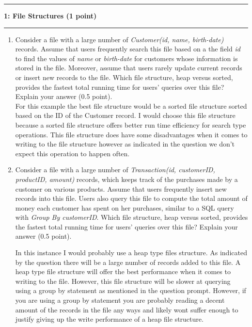 \documentclass[11pt]{article}
\newcommand\question[2]{\vspace{.25in}\hrule\textbf{#1: #2}\vspace{.5em}\hrule\vspace{.10in}}
\begin{document}
\question{1}{File Structures (1 point)}
\begin{enumerate}
\item Consider a file with a large number of \textit{Customer(id, name, birth-date)} records. Assume that users frequently search this file based on a the field \textit{id} to find the values of \textit{name} or \textit{birth-date} for customers whose information is stored in the file. Moreover, assume that users rarely update current records or insert new records to the file. Which file structure, heap versus sorted, provides the fastest total running time for users' queries over this file? Explain your answer (0.5 point).\\

For this example the best file structure would be a sorted file structure sorted based on the ID of the Customer record. I would choose this file structure because a sorted file structure offers better run time efficiency for search type operations. This file structure does have some disadvantages when it comes to writing to the file structure however as indicated in the question we don't expect this operation to happen often.\\

\item Consider a file with a large number of \textit{Transaction(id, customerID, productID, amount)} records, which keeps track of the purchases made by a customer on various products. Assume that users frequently insert new records into this file. Users also query this file to compute the total amount of money each customer has spent on her purchases, similar to a SQL query with {\it Group By customerID}. Which file structure, heap versus sorted, provides the fastest total running time for users' queries over this file?  Explain your answer (0.5 point).

In this instance I would probably use a heap type files structure. As indicated by the question there will be a large number of records added to this file. A heap type file structure will offer the best performance when it comes to writing to the file. However, this file structure will be slower at querying using a group by statement as mentioned in the question prompt. However, if you are using a group by statement you are probably reading a decent amount of the records in the file any ways and likely wont suffer enough to justify giving up the write performance of a heap file structure.\\

\end{enumerate}
\end{document}
